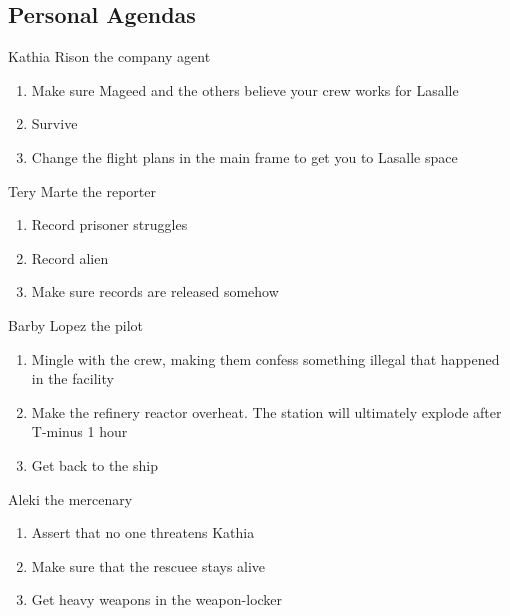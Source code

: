 \clearpage

\subsection{Personal Agendas}

\begin{rpg-commentbox}{Kathia Rison the company agent}
    \begin{enumerate}[label=\textbf{Act \arabic*}, leftmargin=1cm]
        \item Make sure Mageed and the others believe your crew works for Lasalle
        \item Survive
        \item Change the flight plans in the main frame to get you to Lasalle space
    \end{enumerate}
    
\end{rpg-commentbox}


\begin{rpg-commentbox}{Tery Marte the reporter}
    \begin{enumerate}[label=\textbf{Act \arabic*}, leftmargin=1cm]
        \item Record prisoner struggles 
        \item Record alien 
        \item Make sure records are released somehow
    \end{enumerate}
\end{rpg-commentbox}



\begin{rpg-commentbox}{Barby Lopez the pilot}
    \begin{enumerate}[label=\textbf{Act \arabic*}, leftmargin=1cm]
        \item Mingle with the crew, making them confess something illegal that happened in the facility
        \item Make the refinery reactor overheat. The station will ultimately explode after T-minus 1 hour
        \item Get back to the ship
    \end{enumerate}
\end{rpg-commentbox}


\begin{rpg-commentbox}{Aleki the mercenary}
    \begin{enumerate}[label=\textbf{Act \arabic*}, leftmargin=1cm]
        \item Assert that no one threatens Kathia
        \item Make sure that the rescuee stays alive
        \item Get heavy weapons in the weapon-locker
    \end{enumerate}
\end{rpg-commentbox}
